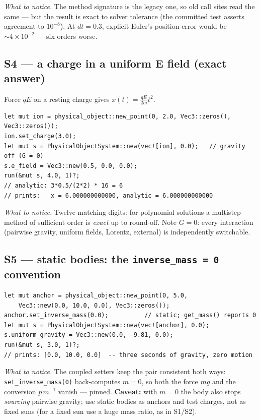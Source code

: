 \documentclass[11pt]{article}
\newcommand{\code}[1]{\texttt{#1}}
\begin{document}
\emph{What to notice.} The method signature is the legacy one, so old
call sites read the same --- but the result is exact to solver
tolerance (the committed test asserts agreement to $10^{-8}$). At
$dt=0.3$, explicit Euler's position error would be
$\sim4\times10^{-2}$ --- six orders worse.

\subsection{S4 --- a charge in a uniform E field (exact answer)}

Force $qE$ on a resting charge gives $x(t) = \frac{qE}{2m}t^2$.

\begin{lstlisting}[language=RustLite]
let mut ion = physical_object::new_point(0, 2.0, Vec3::zeros(), Vec3::zeros());
ion.set_charge(3.0);
let mut s = PhysicalObjectSystem::new(vec![ion], 0.0);   // gravity off (G = 0)
s.e_field = Vec3::new(0.5, 0.0, 0.0);
run(&mut s, 4.0, 1)?;
// analytic: 3*0.5/(2*2) * 16 = 6
// prints:   x = 6.000000000000, analytic = 6.000000000000
\end{lstlisting}

\emph{What to notice.} Twelve matching digits: for polynomial solutions
a multistep method of sufficient order is \emph{exact} up to round-off.
Note $G=0$: every interaction (pairwise gravity, uniform fields,
Lorentz, external) is independently switchable.

\subsection{S5 --- static bodies: the \code{inverse\_mass = 0} convention}

\begin{lstlisting}[language=RustLite]
let mut anchor = physical_object::new_point(0, 5.0,
    Vec3::new(0.0, 10.0, 0.0), Vec3::zeros());
anchor.set_inverse_mass(0.0);          // static; get_mass() reports 0
let mut s = PhysicalObjectSystem::new(vec![anchor], 0.0);
s.uniform_gravity = Vec3::new(0.0, -9.81, 0.0);
run(&mut s, 3.0, 1)?;
// prints: [0.0, 10.0, 0.0]  -- three seconds of gravity, zero motion
\end{lstlisting}

\emph{What to notice.} The coupled setters keep the pair consistent
both ways: \code{set\_inverse\_mass(0)} back-computes $m=0$, so both
the force $mg$ and the conversion $p\,m^{-1}$ vanish --- pinned.
\textbf{Caveat:} with $m=0$ the body also stops \emph{sourcing}
pairwise gravity; use static bodies as anchors and test charges, not as
fixed suns (for a fixed sun use a huge mass ratio, as in S1/S2).
\end{document}
